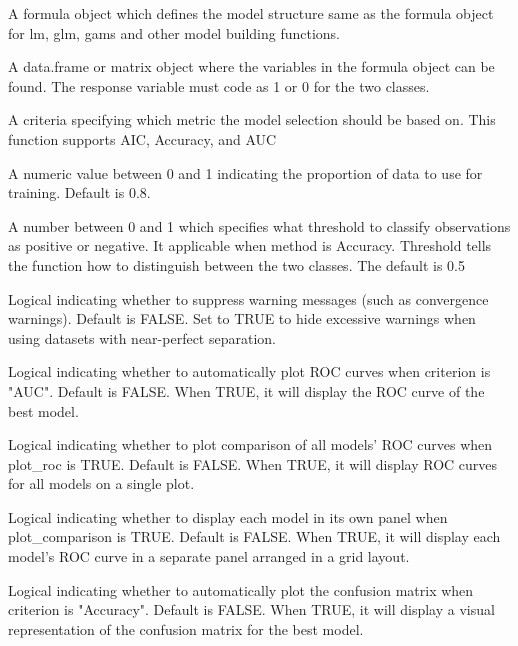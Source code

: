 \documentclass[a4paper]{book}
\begin{document}
\begin{Arguments}
\begin{ldescription}
\item[\code{formula}] A formula object which defines the model structure same as the formula object
for lm, glm, gams and other model building functions.

\item[\code{data}] A data.frame or matrix object where the variables in the formula object can be found. The response variable must code as 1 or 0 for the two classes.

\item[\code{criterion}]  A criteria specifying which metric the model selection should be based on. This function supports AIC, Accuracy, and AUC

\item[\code{training\_percent}] A numeric value between 0 and 1 indicating the proportion of data to use for training. Default is 0.8.

\item[\code{threshold}]  A number between 0 and 1 which specifies what threshold to classify
observations as positive or negative. It applicable when method is Accuracy.
Threshold tells the function how to distinguish between the two classes.
The default is 0.5 

\item[\code{suppress\_warnings}]  Logical indicating whether to suppress warning messages (such as convergence warnings). Default is FALSE. Set to TRUE to hide excessive warnings when using datasets with near-perfect separation. 

\item[\code{plot\_roc}]  Logical indicating whether to automatically plot ROC curves when criterion is "AUC". Default is FALSE. When TRUE, it will display the ROC curve of the best model. 

\item[\code{plot\_comparison}]  Logical indicating whether to plot comparison of all models' ROC curves when plot\_roc is TRUE. Default is FALSE. When TRUE, it will display ROC curves for all models on a single plot. 

\item[\code{multi\_panel}]  Logical indicating whether to display each model in its own panel when plot\_comparison is TRUE. Default is FALSE. When TRUE, it will display each model's ROC curve in a separate panel arranged in a grid layout. 

\item[\code{plot\_cm}]  Logical indicating whether to automatically plot the confusion matrix when criterion is "Accuracy". Default is FALSE. When TRUE, it will display a visual representation of the confusion matrix for the best model. 

\end{ldescription}
\end{Arguments}
\end{document}
